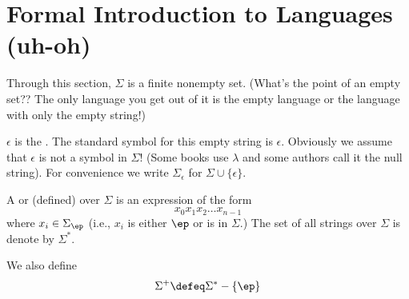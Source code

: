 \section{Formal Introduction to Languages (uh-oh)}

Through this section, $\Sigma$ is a finite nonempty set. (What's
the point of an empty set?? The only language you get out of it is
the empty language or the language with only the empty string!)

\begin{defn}
$\epsilon$ is the . The standard symbol for
this empty string is $\epsilon$. Obviously we assume that $\epsilon$
is not a symbol in $\Sigma$! (Some books use $\lambda$ and some
authors call it the null string). For convenience we write
$\Sigma_\epsilon$ for $\Sigma \cup \{\epsilon\}$.
\end{defn}

\begin{defn}
  A
  or
  \sidebarskip{12pt}
  (defined) over $\Sigma$ is an expression of the form
  \[
  x_0 x_1 x_2 \ldots x_{n-1}
  \]
  where $x_i \in \Sigma_\ep$ (i.e., $x_i$ is either $\ep$ or is in
  $\Sigma$.)
  The set of all strings over $\Sigma$
  is denote by $\Sigma^*$.
\end{defn}

\begin{defn}
We also define
\[
 \Sigma^+ \defeq \Sigma^* - \{ \ep \}
\]
\end{defn}
